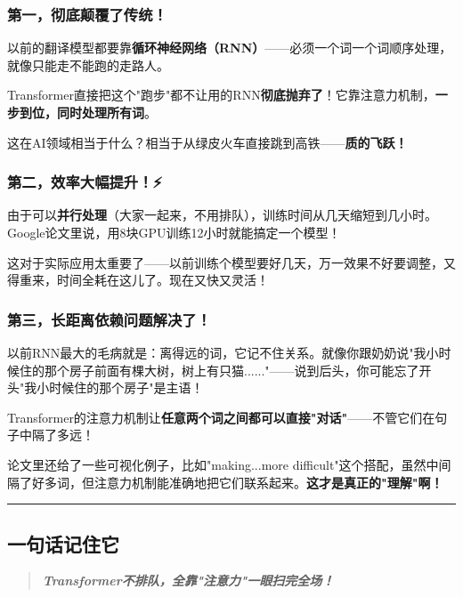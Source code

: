 \documentclass[11pt,a4paper]{article}
\begin{document}
\subsubsection*{第一，彻底颠覆了传统！🔄}

以前的翻译模型都要靠\textbf{循环神经网络（RNN）}——必须一个词一个词顺序处理，就像只能走不能跑的走路人。

Transformer直接把这个"跑步"都不让用的RNN\textbf{彻底抛弃了}！它靠注意力机制，\textbf{一步到位，同时处理所有词}。

这在AI领域相当于什么？相当于从绿皮火车直接跳到高铁——\textbf{质的飞跃！}

\subsubsection*{第二，效率大幅提升！⚡}

由于可以\textbf{并行处理}（大家一起来，不用排队），训练时间从几天缩短到几小时。Google论文里说，用8块GPU训练12小时就能搞定一个模型！

这对于实际应用太重要了——以前训练个模型要好几天，万一效果不好要调整，又得重来，时间全耗在这儿了。现在又快又灵活！

\subsubsection*{第三，长距离依赖问题解决了！🌟}

以前RNN最大的毛病就是：离得远的词，它记不住关系。就像你跟奶奶说"我小时候住的那个房子前面有棵大树，树上有只猫......"——说到后头，你可能忘了开头"我小时候住的那个房子"是主语！

Transformer的注意力机制让\textbf{任意两个词之间都可以直接"对话"}——不管它们在句子中隔了多远！

论文里还给了一些可视化例子，比如"making...more difficult"这个搭配，虽然中间隔了好多词，但注意力机制能准确地把它们联系起来。\textbf{这才是真正的"理解"啊！}

\vspace{0.5em}\noindent\rule{\textwidth}{0.4pt}\vspace{0.5em}

\subsection*{一句话记住它}

\begin{quote}
\textit{\textbf{Transformer不排队，全靠"注意力"一眼扫完全场！}}
\end{quote}
\end{document}
